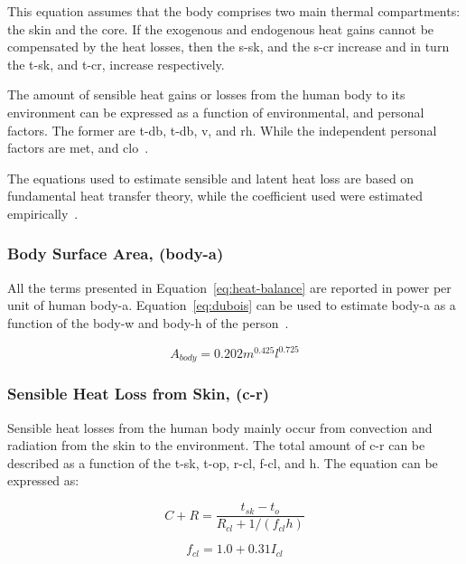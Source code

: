 This equation assumes that the body comprises two main thermal compartments: the skin and the core.
If the exogenous and endogenous heat gains cannot be compensated by the heat losses, then the \ac{s-sk}, and the \ac{s-cr} increase and in turn the \ac{t-sk}, and \ac{t-cr}, increase respectively.

The amount of sensible heat gains or losses from the human body to its environment can be expressed as a function of environmental, and personal factors.
The former are \ac{t-db}, \ac{t-db}, \ac{v}, and \ac{rh}.
While the independent personal factors are \ac{met}, and \ac{clo}~\cite{ASHRA2017}.

The equations used to estimate sensible and latent heat loss are based on fundamental heat transfer theory, while the coefficient used were estimated empirically~\cite{ASHRA2017}.

\subsubsection{Body Surface Area, (\acs{body-a})}

All the terms presented in Equation~\ref{eq:heat-balance} are reported in power per unit of human \ac{body-a}.
Equation~\ref{eq:dubois} can be used to estimate \ac{body-a} as a function of the \ac{body-w} and \ac{body-h} of the person~\cite{DuBois}.

\begin{equation}
    A_{body} = 0.202 m^{0.425} l^{0.725}\label{eq:dubois}
\end{equation}


\subsubsection{Sensible Heat Loss from Skin, (\acs{c-r})}

Sensible heat losses from the human body mainly occur from convection and radiation from the skin to the environment.
The total amount of \ac{c-r} can be described as a function of the \ac{t-sk}, \ac{t-op}, \ac{r-cl}, \ac{f-cl}, and \ac{h}.
The equation can be expressed as:

\begin{equation}
    C+R=\frac{t_{s k}-t_{o}}{R_{c l}+1 /\left(f_{c l} h\right)}\label{eq:c-r}
\end{equation}

\begin{equation}
    f_{cl}=1.0 + 0.31 I_{cl} \label{eq:f-cl}
\end{equation}

